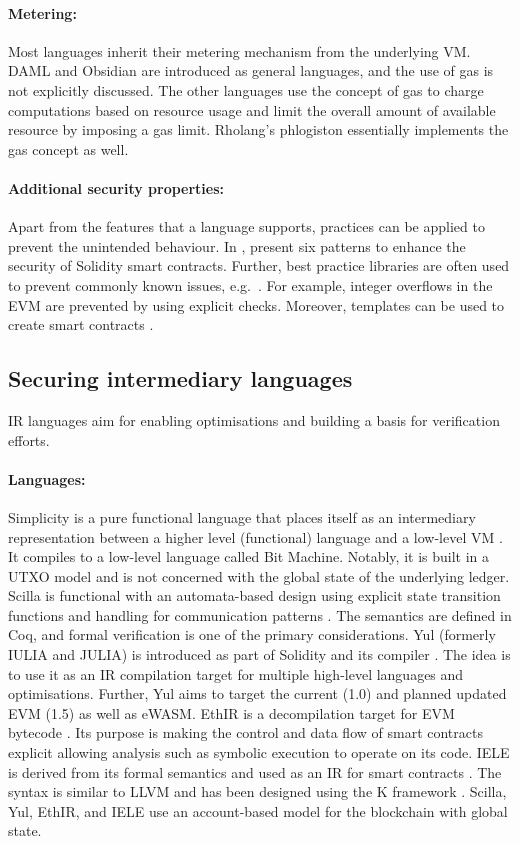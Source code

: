 \paragraph{Metering:} Most languages inherit their metering mechanism from the underlying VM. DAML and Obsidian are introduced as general languages, and the use of gas is not explicitly discussed. The other languages use the concept of gas to charge computations based on resource usage and limit the overall amount of available resource by imposing a gas limit. Rholang's phlogiston essentially implements the gas concept as well.


\paragraph{Additional security properties:} 
Apart from the features that a language supports, practices can be applied to prevent the unintended behaviour.
In \cite{Wohrer2018}, present six patterns to enhance the security of Solidity smart contracts.
Further, best practice libraries are often used to prevent commonly known issues, e.g.\ \cite{ConsenSys2018Security}.
For example, integer overflows in the EVM are prevented by using explicit checks.
Moreover, templates can be used to create smart contracts \cite{Clack2016}.

\subsection{Securing intermediary languages}
IR languages aim for enabling optimisations and building a basis for verification efforts.

\paragraph{Languages:} Simplicity is a pure functional language that places itself as an intermediary representation between a higher level (functional) language and a low-level VM \cite{OConnor2017}. It compiles to a low-level language called Bit Machine. Notably, it is built in a UTXO model and is not concerned with the global state of the underlying ledger.
Scilla is functional with an automata-based design using explicit state transition functions and handling for communication patterns \cite{Sergey2018}. The semantics are defined in Coq, and formal verification is one of the primary considerations.
Yul (formerly IULIA and JULIA) is introduced as part of Solidity and its compiler \cite{EthereumFoundation2018IULIA}. The idea is to use it as an IR compilation target for multiple high-level languages and optimisations. Further, Yul aims to target the current (1.0) and planned updated EVM (1.5) as well as eWASM.
EthIR is a decompilation target for EVM bytecode \cite{Albert2018}. Its purpose is making the control and data flow of smart contracts explicit allowing analysis such as symbolic execution to operate on its code. 
IELE is derived from its formal semantics and used as an IR for smart contracts \cite{Kasampalis2018}. The syntax is similar to LLVM and has been designed using the K framework \cite{Rosu2007}.
Scilla, Yul, EthIR, and IELE use an account-based model for the blockchain with global state.

